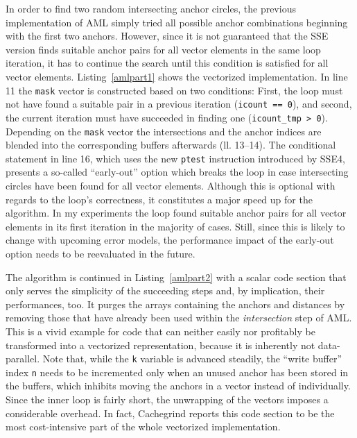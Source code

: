 
In order to find two random intersecting anchor circles, the previous implementation of AML simply tried all possible anchor combinations beginning with the first two anchors. However, since it is not guaranteed that the SSE version finds suitable anchor pairs for all vector elements in the same loop iteration, it has to continue the search until this condition is satisfied for all vector elements. Listing~\ref{amlpart1} shows the vectorized implementation. In line 11 the \texttt{mask} vector is constructed based on two conditions: First, the loop must not have found a suitable pair in a previous iteration (\texttt{icount == 0}), and second, the current iteration must have succeeded in finding one (\texttt{icount\_tmp > 0}). Depending on the \texttt{mask} vector the intersections and the anchor indices are blended into the corresponding buffers afterwards (ll. 13--14). The conditional statement in line 16, which uses the new \texttt{ptest} instruction introduced by SSE4, presents a so-called ``early-out'' option which breaks the loop in case intersecting circles have been found for all vector elements. Although this is optional with regards to the loop's correctness, it constitutes a major speed up for the algorithm. In my experiments the loop found suitable anchor pairs for all vector elements in its first iteration in the majority of cases. Still, since this is likely to change with upcoming error models, the performance impact of the early-out option needs to be reevaluated in the future.


The algorithm is continued in Listing~\ref{amlpart2} with a scalar code section that only serves the simplicity of the succeeding steps and, by implication, their performances, too. It purges the arrays containing the anchors and distances by removing those that have already been used within the \emph{intersection} step of AML. This is a vivid example for code that can neither easily nor profitably be transformed into a vectorized representation, because it is inherently not data-parallel. Note that, while the \texttt{k} variable is advanced steadily, the ``write buffer'' index \texttt{n} needs to be incremented only when an unused anchor has been stored in the buffers, which inhibits moving the anchors in a vector instead of individually. Since the inner loop is fairly short, the unwrapping of the vectors imposes a considerable overhead. In fact, Cachegrind reports this code section to be the most cost-intensive part of the whole vectorized implementation.

